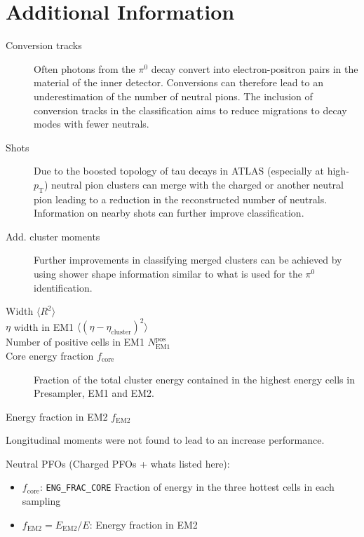 \section{Additional Information}

\begin{description}
\item[Conversion tracks] Often photons from the $\pi^0$ decay convert into
  electron-positron pairs in the material of the inner detector. Conversions can
  therefore  lead to an
  underestimation of the number of neutral pions. The inclusion of conversion
  tracks in the classification aims to reduce migrations to decay modes with
  fewer neutrals.

\item[Shots] Due to the boosted topology of tau decays in ATLAS (especially at
  high-$p_\text{T}$) neutral pion clusters can merge with the charged or another
  neutral pion leading to a reduction in the reconstructed number of neutrals.
  Information on nearby shots 
  can further improve classification.

\item[Add. cluster moments] Further improvements in classifying merged clusters
  can be achieved by using shower shape information similar to what is used for
  the $\pi^0$ identification.
\end{description}

\begin{description}
\item[Width $\langle R^2 \rangle$]
\item[$\eta$ width in EM1 $\langle (\eta - \eta_\text{cluster})^2\rangle$]
\item[Number of positive cells in EM1 $N_\text{EM1}^\text{pos}$]
\item[Core energy fraction $f_\text{core}$] Fraction of the total cluster energy
  contained in the highest energy cells in Presampler, EM1 and EM2.
\item[Energy fraction in EM2 $f_\text{EM2}$]
\end{description}
Longitudinal moments were not found to lead to an increase performance.


Neutral PFOs (Charged PFOs + whats listed here):
\begin{itemize}
\item $f_\text{core}$: \texttt{ENG\_FRAC\_CORE} Fraction of energy in the three
  hottest cells in each sampling 
\item $f_\text{EM2} = E_\text{EM2} / E$: Energy fraction in EM2 
\end{itemize}

